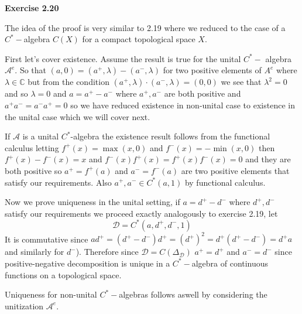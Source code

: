 \documentclass{article}
\begin{document}
\medskip

\vspace{0.5cm}

\textbf{Exercise 2.20}

\vspace{0.5cm}

The idea of the proof is very similar to 2.19 where we reduced to the case of a $C^*-$algebra $C(X)$ for a compact topological space $X$.

First let's cover existence. Assume the result is true for the unital $C^*-$ algebra $\mathcal A^e$. So that $(a,0) =(a^+,\lambda) - (a^-,\lambda)$ for two positive elements of $A^e$ where $\lambda \in \mathbb C$ but from the condition $(a^+,\lambda) \cdot (a^-,\lambda) =(0,0) $ we see that $\lambda^2 = 0$ and so $\lambda = 0$ and $a = a^+ - a^-$ where $a^+,a^-$ are both positive and $a^+a^- = a^-a^+ = 0$ so we have reduced existence in non-unital case to existence in the unital case which we will cover next.

If $\mathcal A$ is a unital $C^*$-algebra the existence result follows from the functional calculus letting $f^+(x) = \max(x,0)$ and $f^-(x) = - \min(x,0)$ then $f^+(x) - f^-(x) = x$ and $f^-(x)f^+(x) = f^+(x)f^-(x) = 0$ and they are both positive so $a^+ = f^+(a)$ and $a^- = f^-(a)$ are two positive elements that satisfy our requirements. Also $a^+,a^- \in C^*(a,1)$ by functional calculus.

Now we prove uniqueness in the unital setting, if $a = d^+ - d^-$ where $d^+,d^-$ satisfy our requirements we proceed exactly analogously to exercise 2.19, let 
$$\mathcal D = C^*(a,d^+, d^-, 1)$$
It is commutative since $ad^+ = (d^+ - d^-)d^+ = (d^+)^2 = d^+ (d^+ - d^-) = d^+ a$ and similarly for $d^-$). Therefore since $\mathcal D = C(\Delta_\mathcal D)$ $a^+ = d^+$ and $a^- = d^-$ since positive-negative decomposition is unique in a $C^*-$algebra of continuous functions on a topological space.

Uniqueness for non-unital $C^*-$algebras follows aswell by considering the unitization $\mathcal A^e$.

\vspace{0.5cm}
\end{document}
